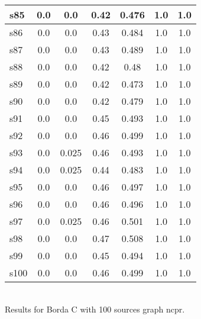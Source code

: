\documentclass{article}
\begin{document}
\begin{tabular}{|l|c|c|c|c|c|c|}
\hline
s85 &0.0 & 0.0 & 0.42 & 0.476 & 1.0 & 1.0\\
\hline
s86 &0.0 & 0.0 & 0.43 & 0.484 & 1.0 & 1.0\\
\hline
s87 &0.0 & 0.0 & 0.43 & 0.489 & 1.0 & 1.0\\
\hline
s88 &0.0 & 0.0 & 0.42 & 0.48 & 1.0 & 1.0\\
\hline
s89 &0.0 & 0.0 & 0.42 & 0.473 & 1.0 & 1.0\\
\hline
s90 &0.0 & 0.0 & 0.42 & 0.479 & 1.0 & 1.0\\
\hline
s91 &0.0 & 0.0 & 0.45 & 0.493 & 1.0 & 1.0\\
\hline
s92 &0.0 & 0.0 & 0.46 & 0.499 & 1.0 & 1.0\\
\hline
s93 &0.0 & 0.025 & 0.46 & 0.493 & 1.0 & 1.0\\
\hline
s94 &0.0 & 0.025 & 0.44 & 0.483 & 1.0 & 1.0\\
\hline
s95 &0.0 & 0.0 & 0.46 & 0.497 & 1.0 & 1.0\\
\hline
s96 &0.0 & 0.0 & 0.46 & 0.496 & 1.0 & 1.0\\
\hline
s97 &0.0 & 0.025 & 0.46 & 0.501 & 1.0 & 1.0\\
\hline
s98 &0.0 & 0.0 & 0.47 & 0.508 & 1.0 & 1.0\\
\hline
s99 &0.0 & 0.0 & 0.45 & 0.494 & 1.0 & 1.0\\
\hline
s100 &0.0 & 0.0 & 0.46 & 0.499 & 1.0 & 1.0\\
\hline
\end{tabular}\\

\noindent Results for Borda C with 100 sources graph ncpr.
\end{document}
